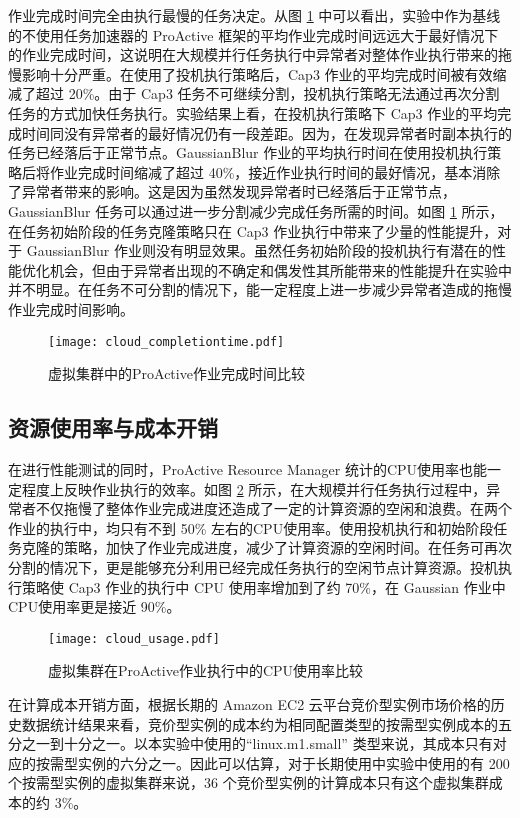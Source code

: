 作业完成时间完全由执行最慢的任务决定。从图 \ref{figure:completiontime_cloud} 中可以看出，实验中作为基线的不使用任务加速器的 ProActive 框架的平均作业完成时间远远大于最好情况下的作业完成时间，这说明在大规模并行任务执行中异常者对整体作业执行带来的拖慢影响十分严重。在使用了投机执行策略后，Cap3 作业的平均完成时间被有效缩减了超过 20\%。由于 Cap3 任务不可继续分割，投机执行策略无法通过再次分割任务的方式加快任务执行。实验结果上看，在投机执行策略下 Cap3 作业的平均完成时间同没有异常者的最好情况仍有一段差距。因为，在发现异常者时副本执行的任务已经落后于正常节点。GaussianBlur 作业的平均执行时间在使用投机执行策略后将作业完成时间缩减了超过 40\%，接近作业执行时间的最好情况，基本消除了异常者带来的影响。这是因为虽然发现异常者时已经落后于正常节点，GaussianBlur 任务可以通过进一步分割减少完成任务所需的时间。如图 \ref{figure:completiontime_cloud} 所示，在任务初始阶段的任务克隆策略只在 Cap3 作业执行中带来了少量的性能提升，对于 GaussianBlur 作业则没有明显效果。虽然任务初始阶段的投机执行有潜在的性能优化机会，但由于异常者出现的不确定和偶发性其所能带来的性能提升在实验中并不明显。在任务不可分割的情况下，能一定程度上进一步减少异常者造成的拖慢作业完成时间影响。
\begin{figure}
  \centering
  \texttt{[image: cloud\_completiontime.pdf]}
  \caption{虚拟集群中的ProActive作业完成时间比较}
  \label{figure:completiontime_cloud}
\end{figure}

\subsection{资源使用率与成本开销}
\label{sec:no2_usage}
在进行性能测试的同时，ProActive Resource Manager 统计的CPU使用率也能一定程度上反映作业执行的效率。如图 \ref{figure:resourceusage_cloud} 所示，在大规模并行任务执行过程中，异常者不仅拖慢了整体作业完成进度还造成了一定的计算资源的空闲和浪费。在两个作业的执行中，均只有不到 50\% 左右的CPU使用率。使用投机执行和初始阶段任务克隆的策略，加快了作业完成进度，减少了计算资源的空闲时间。在任务可再次分割的情况下，更是能够充分利用已经完成任务执行的空闲节点计算资源。投机执行策略使 Cap3 作业的执行中 CPU 使用率增加到了约 70\%，在 Gaussian 作业中CPU使用率更是接近 90\%。
\begin{figure}
  \centering
  \texttt{[image: cloud\_usage.pdf]}
  \caption{虚拟集群在ProActive作业执行中的CPU使用率比较}
  \label{figure:resourceusage_cloud}
\end{figure}

在计算成本开销方面，根据长期的 Amazon EC2 云平台竞价型实例市场价格的历史数据统计结果来看，竞价型实例的成本约为相同配置类型的按需型实例成本的五分之一到十分之一。以本实验中使用的``linux.m1.small'' 类型来说，其成本只有对应的按需型实例的六分之一。因此可以估算，对于长期使用中实验中使用的有 200 个按需型实例的虚拟集群来说，36 个竞价型实例的计算成本只有这个虚拟集群成本的约 3\%。

